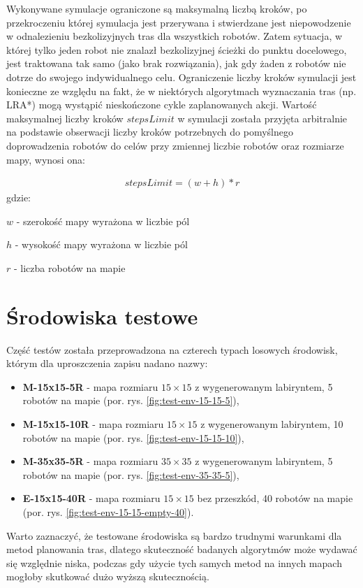 Wykonywane symulacje ograniczone są maksymalną liczbą kroków, po przekroczeniu której symulacja jest przerywana i stwierdzane jest niepowodzenie w odnalezieniu bezkolizyjnych tras dla wszystkich robotów.
Zatem sytuacja, w której tylko jeden robot nie znalazł bezkolizyjnej ścieżki do punktu docelowego, jest traktowana tak samo (jako brak rozwiązania), jak gdy żaden z robotów nie dotrze do swojego indywidualnego celu.
Ograniczenie liczby kroków symulacji jest konieczne ze względu na fakt, że w niektórych algorytmach wyznaczania tras (np. LRA*) mogą wystąpić nieskończone cykle zaplanowanych akcji.
Wartość maksymalnej liczby kroków $stepsLimit$ w symulacji została przyjęta arbitralnie na podstawie obserwacji liczby kroków potrzebnych do pomyślnego doprowadzenia robotów do celów przy zmiennej liczbie robotów oraz rozmiarze mapy, wynosi ona:

\begin{gather}
 	stepsLimit = (w + h) * r
 	\label{eq:steps-limit} 
\end{gather}
 gdzie:

 $w$ - szerokość mapy wyrażona w liczbie pól

 $h$ - wysokość mapy wyrażona w liczbie pól

 $r$ - liczba robotów na mapie

\section{Środowiska testowe}
Część testów została przeprowadzona na czterech typach losowych środowisk, którym dla uproszczenia zapisu nadano nazwy:
\begin{itemize}
	\item {\bf M-15x15-5R} - mapa rozmiaru $15 \times 15$ z wygenerowanym labiryntem, 5 robotów na mapie (por. rys. \ref{fig:test-env-15-15-5}),
	\item {\bf M-15x15-10R} - mapa rozmiaru $15 \times 15$ z wygenerowanym labiryntem, 10 robotów na mapie (por. rys. \ref{fig:test-env-15-15-10}),
	\item {\bf M-35x35-5R} - mapa rozmiaru $35 \times 35$ z wygenerowanym labiryntem, 5 robotów na mapie (por. rys. \ref{fig:test-env-35-35-5}),
	\item {\bf E-15x15-40R} - mapa rozmiaru $15 \times 15$ bez przeszkód, 40 robotów na mapie (por. rys. \ref{fig:test-env-15-15-empty-40}).
\end{itemize}

Warto zaznaczyć, że testowane środowiska są bardzo trudnymi warunkami dla metod planowania tras, dlatego skuteczność badanych algorytmów może wydawać się względnie niska, podczas gdy użycie tych samych metod na innych mapach mogłoby skutkować dużo wyższą skutecznością.

